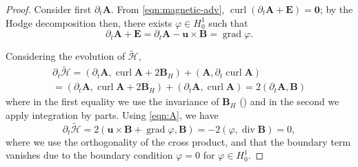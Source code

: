 \documentclass[10pt,a4paper]{amsart}
\newcommand\curl{\operatorname{curl}}
\newcommand\grad{\operatorname{grad}}
\renewcommand\div{\operatorname{div}}
\begin{document}
\begin{proof}
    Consider first $\partial_t\bm A$.
    From \eqref{eqn:magnetic-adv}, $\curl(\partial_t\bm A + \bm E) = \bm 0$;
    by the Hodge decomposition then, there exists $\varphi \in H^1_0$ such that
    \begin{equation}\label{eqn:A}
        \partial_t\bm A + \bm E = \partial_t \bm{A} - \bm{u}\times \bm{B} = \grad\varphi.
    \end{equation}
    
    Considering the evolution of $\tilde{\mathcal{H}}$,
    \begin{multline}
        \partial_t\tilde{\mathcal{H}}
      = (\partial_t\bm A, \curl \bm A + 2\bm B_H) + (\bm A, \partial_t\curl \bm A)  \\
      = (\partial_t\bm A, \curl \bm A + 2\bm B_H) + (\partial_t\bm A, \curl \bm A)
      = 2(\partial_t\bm A, \bm B)
    \end{multline}
    where in the first equality we use the invariance of $\bm B_H$ () and in the second we apply integration by parts.
    Using \eqref{eqn:A}, we have
    \begin{equation}
        \partial_t\tilde{\mathcal{H}}
      = 2(\bm u \times \bm B + \grad\varphi, \bm B)
      = - 2(\varphi, \div \bm B)
      = 0,
    \end{equation}
    where we use the orthogonality of the cross product, and that the boundary term vanishes due to the boundary condition $\varphi=0$ for $\varphi\in H_0^1$.
\end{proof}
\end{document}
